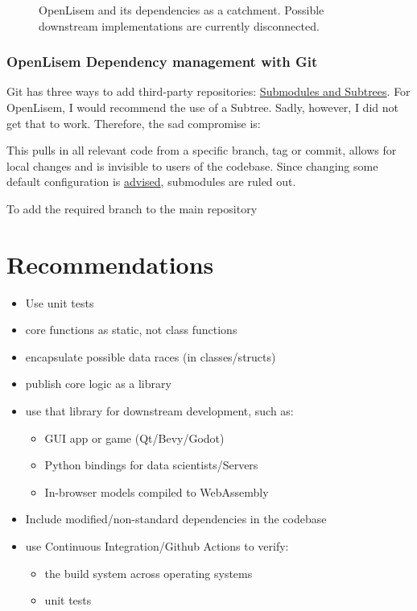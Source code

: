 \documentclass[a4paper]{article} %
\begin{document}
\begin{figure}
    \begin{center}
        
    \end{center}
    \caption{OpenLisem and its dependencies as a catchment. Possible downstream
    implementations are currently disconnected.}\label{fig:catchment}
\end{figure}

\subsubsection{OpenLisem Dependency management with Git}\label{subs:deps}

Git has three ways to add third-party repositories:
\href{https://stackoverflow.com/questions/32407634/when-to-use-git-subtree}{Submodules
and Subtrees}. For OpenLisem, I would recommend the use of a Subtree. Sadly, however, I did not get that to work. Therefore, the sad compromise is:


This pulls
in all relevant code from a specific branch, tag or commit, allows for local
changes and is invisible to users of the codebase. Since changing some default
configuration is
\href{https://github.com/vjetten/openlisem/blob/cd0573a24bcb95f3d90c1c36eb1a44b6714123e4/compile_lisem_linux.txt#L35}{advised},
submodules are ruled out.

To add the required branch to the main repository

\section{Recommendations}

\begin{itemize}
    \item Use unit tests 
    \item core functions as static, not class functions 
    \item encapsulate possible data races (in classes/structs) 
    \item publish core logic as a library 
    \item use that library for downstream development, such as:
    \begin{itemize}
        \item GUI app or game (Qt/Bevy/Godot)
        \item Python bindings for data scientists/Servers
        \item In-browser models compiled to WebAssembly
    \end{itemize}
    \item Include modified/non-standard dependencies in the codebase
    \item use Continuous Integration/Github Actions to verify:
    \begin{itemize}
        \item the build system across operating systems
        \item unit tests
    \end{itemize}
\end{itemize}

\printbibliography

\appendix
\end{document}
